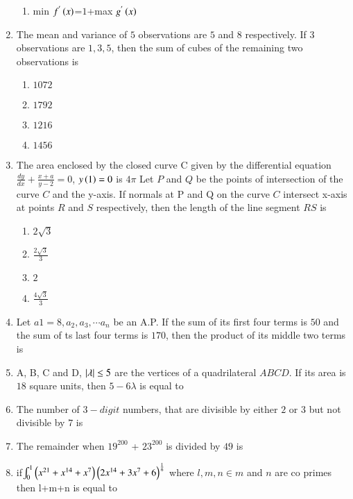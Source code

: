 \documentclass[journal,12pt,onecolumn]{IEEEtran}
\theoremstyle{remark}
\begin{document}
\begin{enumerate}
\begin{enumerate}
    \item min $f^{'}\left(x\right)$=$1$+max $ g^{'}\left(x\right)$
\end{enumerate}
\item The mean and variance of $5$ observations are $5$ and 
$8$ respectively. If $3$ observations are $1, 3, 5$, then 
the sum of cubes of the remaining two 
observations is
\begin{enumerate}
    \item $1072$
    \item $1792$
    \item $1216$
    \item $1456$
\end{enumerate}
\item The area enclosed by the closed curve C given by 
the differential equation 
$\frac{dy}{dx}+\frac{x+a}{y-2}=0$, $y\left(1\right)=0$ is $4\pi$
 Let $P$ and $Q$ be the points of intersection of the 
curve $C$ and the y-axis. If normals at P and Q on 
the curve $C$ intersect x-axis at points $R$ and $S$ 
respectively, then the length of the line segment 
$RS$ is
\begin{enumerate}
    \item $2\sqrt{3}$
    \item $\frac{2\sqrt{3}}{3}$
    \item $2$
    \item $\frac{4\sqrt{3}}{3}$
\end{enumerate}
\item Let $a1 = 8, a_2, a_3,\cdots  a_n$ be an A.P. If the sum of its 
first four terms is $50$ and the sum of ts last four 
terms is $170$, then the product of its middle two 
terms is
\item A, B, C and D, 
$\left\vert\lambda\right\vert \leq 5$ are the vertices of a quadrilateral $ABCD$. If 
its area is $18$ square units, then $5-6\lambda$ is equal to
\item The number of 
$3-digit$ numbers, that are divisible 
by either $2$ or $3$ but not divisible by $7$ is
\item The remainder when $19^{200}$ + $23^{200}$ is divided by $49$
is 
\item if$\int_{0}^{1}\left(x^{21}+x^{14}+x^7\right)\left(2x^{14}+3x^{7}+6\right)^\frac{1}{6}$ where $l,m,n \in m$ and $n$ are co primes then l+m+n is equal to
\end{enumerate}
\end{document}
